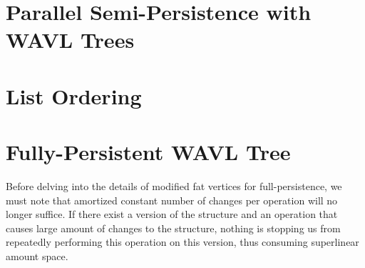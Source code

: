 \section{Parallel Semi-Persistence with WAVL Trees}



\section{List Ordering}

\section{Fully-Persistent WAVL Tree}

Before delving into the details of modified fat vertices for full-persistence, we must note that amortized constant number of changes per operation will no longer suffice. If there exist a version of the structure and an operation that causes large amount of changes to the structure, nothing is stopping us from repeatedly performing this operation on this version, thus consuming superlinear amount space.